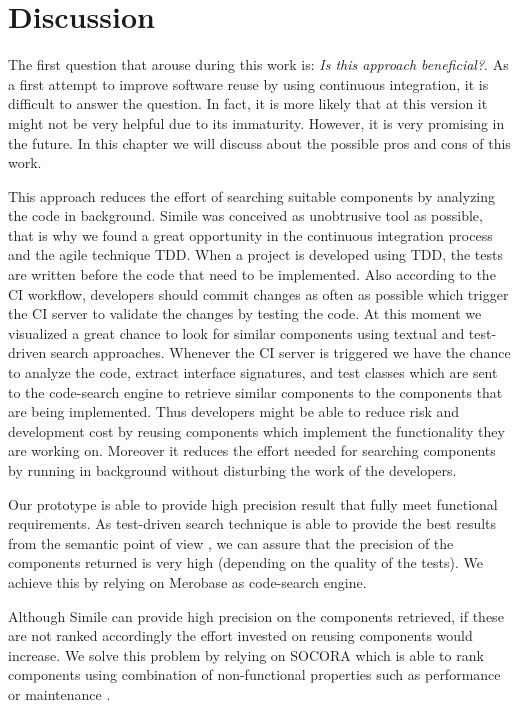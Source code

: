 \chapter{Discussion}
The first question that arouse during this work is: \emph{Is this approach beneficial?}. As a first attempt to improve software reuse by using continuous integration, it is difficult to answer the question. In fact, it is more likely that at this version it might not be very helpful due to its immaturity. However, it is very promising in the future. In this chapter we will discuss about the possible pros and cons of this work.

This approach reduces the effort of searching suitable components by analyzing the code in background. Simile was conceived as unobtrusive tool as possible, that is why we found a great opportunity in the continuous integration process and the agile technique TDD. When a project is developed using TDD, the tests are written before the code that need to be implemented. Also according to the CI workflow, developers should commit changes as often as possible which trigger the CI server to validate the changes by testing the code. At this moment we visualized a great chance to look for similar components using textual and test-driven search approaches. Whenever the CI server is triggered we have the chance to analyze the code, extract interface signatures, and test classes which are sent to the code-search engine to retrieve similar components to the components that are being implemented. Thus developers might be able to reduce risk and development cost by reusing components which implement the functionality they are working on. Moreover it reduces the effort needed for searching components by running in background without disturbing the work of the developers.

Our prototype is able to provide high precision result that fully meet functional requirements. As test-driven search technique is able to provide the best results from the semantic point of view \cite{Reiss2009,Hummel2008,Hummel2013}, we can assure that the precision of the components returned is very high (depending on the quality of the tests). We achieve this by relying on Merobase as code-search engine.

Although Simile can provide high precision on the components retrieved, if these are not ranked accordingly the effort invested on reusing components would increase. We solve this problem by relying on SOCORA which is able to rank components using combination of non-functional properties such as performance or maintenance \cite{Kessel2016}.

